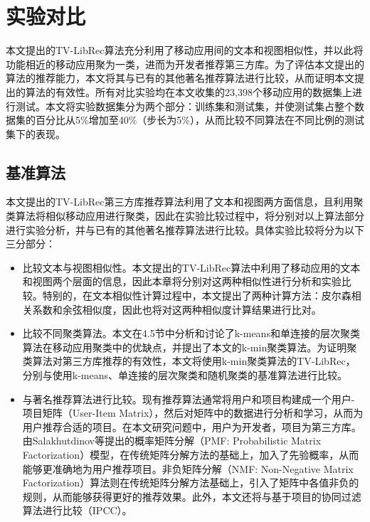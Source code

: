 \section{实验对比}
本文提出的TV-LibRec算法充分利用了移动应用间的文本和视图相似性，并以此将功能相近的移动应用聚为一类，进而为开发者推荐第三方库。为了评估本文提出的算法的推荐能力，本文将其与已有的其他著名推荐算法进行比较，从而证明本文提出的算法的有效性。所有对比实验均在本文收集的23,398个移动应用的数据集上进行测试。本文将实验数据集分为两个部分：训练集和测试集，并使测试集占整个数据集的百分比从5\%增加至40\%（步长为5\%），从而比较不同算法在不同比例的测试集下的表现。


\subsection{基准算法}
本文提出的TV-LibRec第三方库推荐算法利用了文本和视图两方面信息，且利用聚类算法将相似移动应用进行聚类，因此在实验比较过程中，将分别对以上算法部分进行实验分析，并与已有的其他著名推荐算法进行比较。具体实验比较将分为以下三分部分：
\begin{itemize}
\item
比较文本与视图相似性。本文提出的TV-LibRec算法中利用了移动应用的文本和视图两个层面的信息，因此本章将分别对这两种相似性进行分析和实验比较。特别的，在文本相似性计算过程中，本文提出了两种计算方法：皮尔森相关系数和余弦相似度，因此也将对这两种相似度计算结果进行比对。

\item
比较不同聚类算法。本文在4.5节中分析和讨论了k-means和单连接的层次聚类算法在移动应用聚类中的优缺点，并提出了本文的k-min聚类算法。为证明聚类算法对第三方库推荐的有效性，本文将使用k-min聚类算法的TV-LibRec，分别与使用k-means、单连接的层次聚类和随机聚类的基准算法进行比较。

\item
与著名推荐算法进行比较。现有推荐算法通常将用户和项目构建成一个用户-项目矩阵（User-Item Matrix），然后对矩阵中的数据进行分析和学习，从而为用户推荐合适的项目。在本文研究问题中，用户为开发者，项目为第三方库。由Salakhutdinov等\cite{salakhutdinov2011probabilistic}提出的概率矩阵分解（PMF: Probabilistic Matrix Factorization）模型，在传统矩阵分解方法的基础上，加入了先验概率，从而能够更准确地为用户推荐项目\cite{liu2013bayesian}。非负矩阵分解（NMF: Non-Negative Matrix Factorization）算法则在传统矩阵分解方法基础上，引入了矩阵中各值非负的规则，从而能够获得更好的推荐效果\cite{luo2014efficient}。此外，本文还将与基于项目的协同过滤算法进行比较（IPCC）\cite{yang2014survey}。
\end{itemize}


